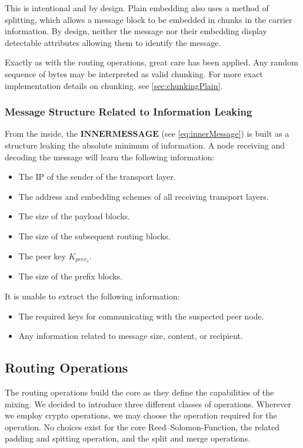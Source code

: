 This is intentional and by design. Plain embedding also uses  a method of splitting, which allows a message block to be embedded in chunks in the carrier information. By design, neither the message nor their embedding display detectable attributes allowing them to identify the message. 

Exactly as with the routing operations, great care has been applied. Any random sequence of bytes may be interpreted as valid chunking. For more exact implementation details on chunking, see \cref{sec:chunkingPlain}.

\subsubsection{Message Structure Related to Information Leaking}
From the inside, the $\mathbf{INNERMESSAGE}$ (see \cref{eq:innerMessage}) is built as a structure leaking the absolute minimum of information. A node receiving and decoding the message will learn the following information:
\begin{itemize}
	\item The IP of the sender of the transport layer.
	\item The address and embedding schemes of all receiving transport layers.
	\item The size of the payload blocks.
	\item The size of the subsequent routing blocks.
	\item The peer key $K_{peer_o}$.
	\item The size of the prefix blocks.
\end{itemize}

It is unable to extract the following information:
\begin{itemize}
	\item The required keys for communicating with the suspected peer node.
	\item Any information related to message size, content, or recipient.
\end{itemize}

\subsection{Routing Operations}\label{sec:operations}
The routing operations build the core as they define the capabilities of the mixing. We decided to introduce three different classes of operations. Wherever we employ crypto operations, we may choose the operation required for the operation. No choices exist for the core Reed--Solomon-Function, the related padding and spitting operation, and the split and merge operations.

